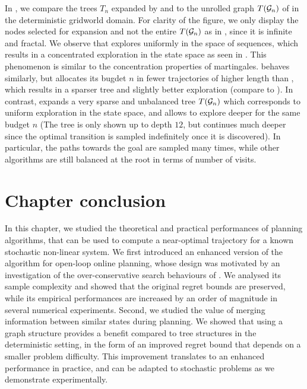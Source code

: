 In , we compare the trees $T_n$ expanded by \OPD and \KLOLOP to the unrolled graph $T(\mathcal{G}_n)$ of \GBOPD in the deterministic gridworld domain. For clarity of the figure, we only display the nodes selected for expansion and not the entire $T(\mathcal{G}_n)$ as in , since it is infinite and fractal. We observe that \OPD explores uniformly in the space of sequences, which results in a concentrated exploration in the state space as seen in . This phenomenon is similar to the concentration properties of martingales. \KLOLOP behaves similarly, but allocates its bugdet $n$ in fewer trajectories of higher length than \OPD, which results in a sparser tree and slightly better exploration (compare  to ). In contrast, \GBOPD expands a very sparse and unbalanced tree $T(\mathcal{G}_n)$ which corresponds to uniform exploration in the state space, and allows to explore deeper for the same budget $n$ (The tree is only shown up to depth $12$, but continues much deeper since the optimal transition is sampled indefinitely once it is discovered). In particular, the paths towards the goal are sampled many times, while other algorithms are still balanced at the root in terms of number of visits.

\section*{Chapter conclusion}

In this chapter, we studied the theoretical and practical performances of planning algorithms, that can be used to compute a near-optimal trajectory for a known stochastic non-linear system.
We first introduced an enhanced version of the \OLOP algorithm for open-loop online planning, whose design was motivated by an investigation of the over-conservative search behaviours of \OLOP. We analysed its sample complexity and showed that the original regret bounds are preserved, while its empirical performances are increased by an order of magnitude in several numerical experiments. Second, we studied the value of merging information between similar states during planning. We showed that using a graph structure provides a benefit compared to tree structures in the deterministic setting, in the form of an improved regret bound that depends on a smaller problem difficulty. This improvement translates to an enhanced performance in practice, and can be adapted to stochastic problems as we demonstrate experimentally.


